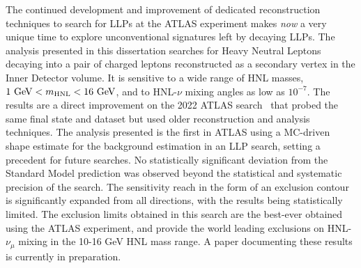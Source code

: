 The continued development and improvement of dedicated reconstruction techniques to search for LLPs at the ATLAS experiment makes \textit{now} a very unique time to explore unconventional signatures left by decaying LLPs.
The analysis presented in this dissertation searches for Heavy Neutral Leptons decaying into a pair of charged leptons reconstructed as a secondary vertex in the Inner Detector volume. It is sensitive to a wide range of HNL masses, $1\text{ GeV}<m_{\mathrm{HNL}}<16\text{ GeV}$, and to HNL-$\nu$ mixing angles as low as $10^{-7}$. The results are a direct improvement on the 2022 ATLAS search~\cite{PhysRevLett.131.061803} that probed the same final state and dataset but used older reconstruction and analysis techniques. The analysis presented is the first in ATLAS using a MC-driven shape estimate for the background estimation in an LLP search, setting a precedent for future searches. No statistically significant deviation from the Standard Model prediction was observed beyond the statistical and systematic precision of the search. The sensitivity reach in the form of an exclusion contour is significantly expanded from all directions, with the results being statistically limited. The exclusion limits obtained in this search are the best-ever obtained using the ATLAS experiment, and provide the world leading exclusions on HNL-$\nu_\mu$ mixing in the 10-16 GeV HNL mass range. A paper documenting these results is currently in preparation.



